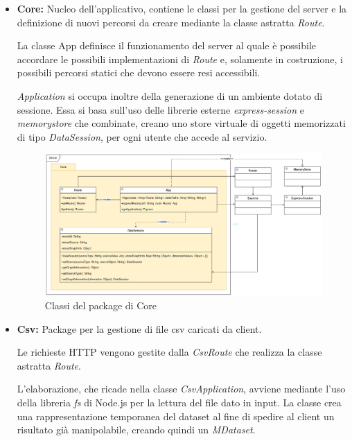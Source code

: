 \documentclass[../manuale_sviluppatore.tex]{subfiles}
\begin{document}
\begin{itemize}
	
	\item \textbf{Core:} Nucleo dell'applicativo, contiene le classi per la gestione del server
	e la definizione di nuovi percorsi da creare mediante la classe astratta \emph{Route}. 
	
	La classe App definisce il funzionamento del server al quale è possibile accordare le 
	possibili implementazioni di \emph{Route} e, solamente in costruzione, i possibili 
	percorsi statici che devono essere resi accessibili. 
	
	\emph{Application} si occupa inoltre della generazione di un ambiente dotato di sessione. Essa 
	si basa sull'uso delle librerie esterne \emph{express-session} e \emph{memorystore} che 
	combinate, creano uno store virtuale di oggetti memorizzati di tipo \emph{DataSession}, per ogni 
	utente che accede al servizio.
		
	\begin{figure}[H]
		\centering
		\includegraphics[width=18cm]{src/img/server-core.png}
		\caption{Classi del package di Core}
	\end{figure}

	\newpage
	\item \textbf{Csv:} Package per la gestione di file csv caricati da client. 
	
	Le richieste HTTP vengono gestite dalla \emph{CsvRoute} che realizza la classe astratta 
	\emph{Route}.
	
	L'elaborazione, che ricade nella classe \emph{CsvApplication}, avviene mediante l'uso della 
	libreria \emph{fs} di Node.js per la lettura del file dato in input. La classe crea una 
	rappresentazione temporanea del dataset al fine di spedire al client un risultato già 
	manipolabile, creando quindi un \emph{MDataset}.
	

\end{itemize}
\end{document}
